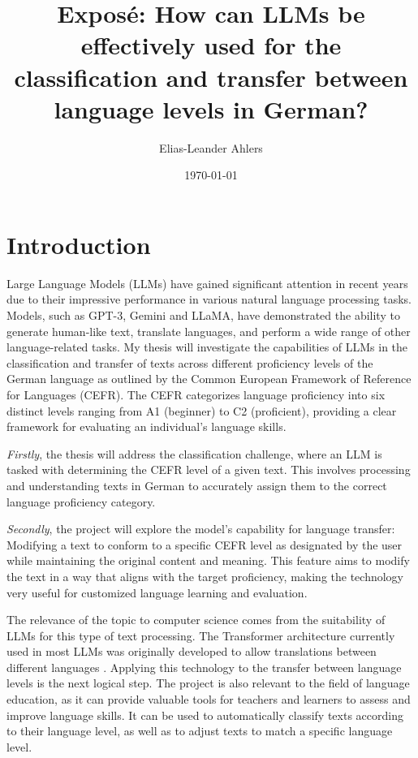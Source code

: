 \documentclass{article}
\title{Exposé: How can LLMs be effectively used for the classification and transfer between language levels in German?}
\author{Elias-Leander Ahlers}
\date{\today}
\begin{document}
\maketitle

\section{Introduction}

Large Language Models (LLMs) have gained significant attention in recent years due to their
impressive performance in various natural language processing tasks. Models, such as GPT-3,
Gemini and LLaMA, have demonstrated the ability to generate human-like text, translate languages, and
perform a wide range of other language-related tasks. My thesis will investigate the capabilities
of LLMs in the classification and transfer of texts across different proficiency levels of the
German language as outlined by the Common European Framework of Reference for Languages (CEFR).
The CEFR categorizes language proficiency into six distinct levels ranging from A1 (beginner) to
C2 (proficient), providing a clear framework for evaluating an individual's language skills.

\textit{Firstly}, the thesis will address the classification challenge, where an LLM is tasked with 
determining the CEFR level of a given text. This involves processing and understanding texts in
German to accurately assign them to the correct language proficiency category. 

\textit{Secondly}, the project will explore the model's capability for language transfer: Modifying
a text to conform to a specific CEFR level as designated by the user while maintaining the original
content and meaning. This feature aims to modify the text in a way that aligns with the target
proficiency, making the technology very useful for customized language learning and evaluation.

The relevance of the topic to computer science comes from the suitability of LLMs for this type of
text processing. The Transformer architecture currently used in most LLMs was originally developed 
to allow translations between different languages \cite{attention_is_all_you_need}. Applying this technology to the transfer between
language levels is the next logical step. The project is also relevant to the field of language 
education, as it can provide valuable tools for teachers and learners to assess and improve language
skills. It can be used to automatically classify texts according to their language level, as well as
to adjust texts to match a specific language level.
\end{document}
